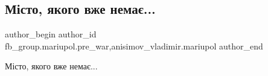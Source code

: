  
 
 
 
 

\subsection{Місто, якого вже немає... }
\label{sec:15_01_2023.fb.fb_group.mariupol.pre_war.4.m_sto__yakogo_vzhe_n}
 
\ifcmt
 author_begin
   author_id fb_group.mariupol.pre_war,anisimov_vladimir.mariupol
 author_end
\fi

Місто, якого вже немає... 
